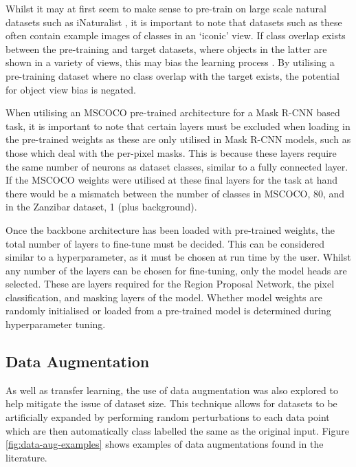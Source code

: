 Whilst it may at first seem to make sense to pre-train on large scale natural datasets such as iNaturalist \cite{van_horn_inaturalist_2018}, it is important to note that datasets such as these often contain example images of classes in an `iconic' view. If class overlap exists between the pre-training and target datasets, where objects in the latter are shown in a variety of views, this may bias the learning process \cite{pantazis_focus_2021}. By utilising a pre-training dataset where no class overlap with the target exists, the potential for object view bias is negated. 

When utilising an MSCOCO pre-trained architecture for a Mask R-CNN based task, it is important to note that certain layers must be excluded when loading in the pre-trained weights as these are only utilised in Mask R-CNN models, such as those which deal with the per-pixel masks. This is because these layers require the same number of neurons as dataset classes, similar to a fully connected layer. If the MSCOCO weights were utilised at these final layers for the task at hand there would be a mismatch between the number of classes in MSCOCO, 80, and in the Zanzibar dataset, 1 (plus background).

Once the backbone architecture has been loaded with pre-trained weights, the total number of layers to fine-tune must be decided. This can be considered similar to a hyperparameter, as it must be chosen at run time by the user. Whilst any number of the layers can be chosen for fine-tuning, only the model heads are selected. These are layers required for the Region Proposal Network, the pixel classification, and masking layers of the model. Whether model weights are randomly initialised or loaded from a pre-trained model is determined during hyperparameter tuning.

\subsection{Data Augmentation}\label{ch:cetDet,sec:initialTesting,sub:dataaugmentation}

As well as transfer learning, the use of data augmentation was also explored to help mitigate the issue of dataset size. This technique allows for datasets to be artificially expanded by performing random perturbations to each data point which are then automatically class labelled the same as the original input. Figure \ref{fig:data-aug-examples} shows examples of data augmentations found in the literature.

